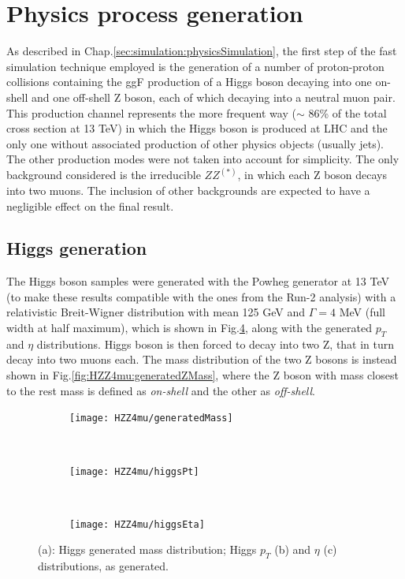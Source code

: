\documentclass[a4paper,twoside,12pt]{book}
\begin{document}
\section{Physics process generation}
As described in Chap.\ref{sec:simulation:physicsSimulation}, the first step of the fast simulation 
technique employed is the generation of a number of proton-proton collisions containing the
ggF production of a Higgs boson decaying into one on-shell and one off-shell Z boson, 
each of which decaying into a neutral muon pair. This production channel represents the more
frequent way ($\sim$ 86\% of the total cross section at 13 TeV) in which the Higgs boson is produced at LHC and the only one without 
associated production of other physics objects (usually jets). The other production modes were not taken
into account for simplicity. The only background considered is the irreducible $ZZ^{(*)}$, 
in which each Z boson decays into two muons. The inclusion of other backgrounds are expected to 
have a negligible effect on the final result\cite{scoping}.

\subsection{Higgs generation}

The Higgs boson samples were generated with the Powheg\cite{Powheg} generator at 13 TeV (to make these results compatible with the ones from the
Run-2 analysis) with a 
relativistic Breit-Wigner distribution with mean 125 GeV and $\Gamma = 4$ MeV (full
width at half maximum), which 
is shown in Fig.\ref{fig:HZZ4mu:generatedHiggs}, along with the generated $p_T$ and $\eta$ distributions. Higgs boson
is then forced to decay into two Z, that in turn decay into two muons each. The mass distribution of the two Z bosons is instead shown in Fig.\ref{fig:HZZ4mu:generatedZMass}, where the Z boson with mass closest to the rest mass
is defined as \textit{on-shell} and the other as \textit{off-shell}.


\begin{figure}
\begin{subfigure}{\linewidth}
\centering
\texttt{[image: HZZ4mu/generatedMass]}
\caption{}
\label{fig:HZZ4mu:generatedHiggs}
\end{subfigure}\\[1ex]
\begin{subfigure}{\linewidth}
\centering
\texttt{[image: HZZ4mu/higgsPt]}
\caption{}
\label{fig:HZZ4mu:higgsPt}
\end{subfigure}\\[1ex]
\begin{subfigure}{\linewidth}
\centering
\texttt{[image: HZZ4mu/higgsEta]}
\caption{}
\label{fig:HZZ4mu:higgsEta}
\end{subfigure}
\caption{(a): Higgs generated mass distribution;	Higgs $p_{T}$ (b) and $\eta$ (c) distributions, as generated.}
\label{fig:HZZ4mu:generatedHiggs}
\end{figure}
\end{document}
